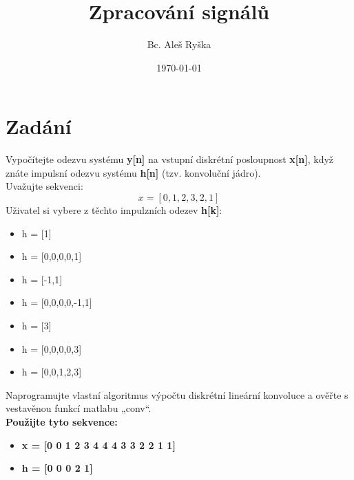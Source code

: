\documentclass{article}
\title{Zpracování signálů} %
\author{Bc. Aleš Ryška} %
\date{\today} %
\begin{document}
\maketitle %



\section{Zadání}
Vypočítejte odezvu systému \textbf{y[n]} na vstupní diskrétní posloupnost \textbf{x[n]}, když znáte impulsní odezvu systému \textbf{h[n]} (tzv. konvoluční jádro).\\

Uvažujte sekvenci:
$$x = [0,1,2,3,2,1]$$
Uživatel si vybere z těchto impulzních odezev \textbf{h[k]}:\\
\begin{itemize}
	\item h = [1]
	\item h = [0,0,0,0,1]
	\item h = [-1,1]
	\item h = [0,0,0,0,-1,1]
	\item h = [3]
	\item h = [0,0,0,0,3]
	\item h = [0,0,1,2,3]
\end{itemize}

Naprogramujte vlastní algoritmus výpočtu diskrétní lineární konvoluce a ověřte s vestavěnou funkcí matlabu „conv“.\\
\textbf{Použijte tyto sekvence:}\\
\begin{itemize}
	\item \textbf{x = [0 0 1 2 3 4 4 4 3 3 2 2 1 1]}
	\item \textbf{h = [0 0 0 2 1]}
\end{itemize}
\end{document}
